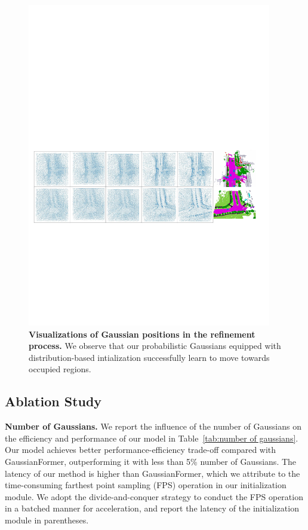 \begin{figure}[!ht]
\centering
\includegraphics[width=0.95\textwidth]{figures/vis_moving.pdf}
\vspace{-2mm}
\caption{\textbf{Visualizations of Gaussian positions in the refinement process.}
We observe that our probabilistic Gaussians equipped with distribution-based intialization successfully learn to move towards occupied regions.
}
\label{fig:moving}
\vspace{-6mm}
\end{figure}



\subsection{Ablation Study}


\textbf{Number of Gaussians.}
We report the influence of the number of Gaussians on the efficiency and performance of our model in Table~\ref{tab:number of gaussians}.
Our model achieves better performance-efficiency trade-off compared with GaussianFormer, outperforming it with less than 5\% number of Gaussians.
The latency of our method is higher than GaussianFormer, which we attribute to the time-consuming farthest point sampling (FPS) operation in our initialization module. 
We adopt the divide-and-conquer strategy to conduct the FPS operation in a batched manner for acceleration, and report the latency of the initialization module in parentheses.

